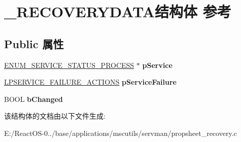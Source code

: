 \hypertarget{struct___r_e_c_o_v_e_r_y_d_a_t_a}{}\section{\+\_\+\+R\+E\+C\+O\+V\+E\+R\+Y\+D\+A\+T\+A结构体 参考}
\label{struct___r_e_c_o_v_e_r_y_d_a_t_a}
\subsection*{Public 属性}
\begin{DoxyCompactItemize}
\item 
\mbox{\label{struct___r_e_c_o_v_e_r_y_d_a_t_a_ae72b28b06e14f488e6baa4be90e782d4}} 
\hyperlink{struct___e_n_u_m___s_e_r_v_i_c_e___s_t_a_t_u_s___p_r_o_c_e_s_s_a}{E\+N\+U\+M\+\_\+\+S\+E\+R\+V\+I\+C\+E\+\_\+\+S\+T\+A\+T\+U\+S\+\_\+\+P\+R\+O\+C\+E\+SS} $\ast$ {\bfseries p\+Service}
\item 
\mbox{\label{struct___r_e_c_o_v_e_r_y_d_a_t_a_a713fed0763a4e3ea758312ed9f6ff9e1}} 
\hyperlink{struct___s_e_r_v_i_c_e___f_a_i_l_u_r_e___a_c_t_i_o_n_s_a}{L\+P\+S\+E\+R\+V\+I\+C\+E\+\_\+\+F\+A\+I\+L\+U\+R\+E\+\_\+\+A\+C\+T\+I\+O\+NS} {\bfseries p\+Service\+Failure}
\item 
\mbox{\label{struct___r_e_c_o_v_e_r_y_d_a_t_a_aeafc5910c7c312d2d38799868b849fac}} 
B\+O\+OL {\bfseries b\+Changed}
\end{DoxyCompactItemize}


该结构体的文档由以下文件生成\+:\begin{DoxyCompactItemize}
\item 
E\+:/\+React\+O\+S-\/0../base/applications/mscutils/servman/propsheet\+\_\+recovery.\+c\end{DoxyCompactItemize}
